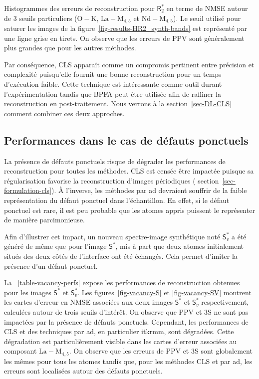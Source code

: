 \begin{normalfigure*}
    \caption{Histogrammes des erreurs de reconstruction pour $\mathsf{R}_2^*$ en terme de NMSE autour de 3 seuils particuliers ($\mathrm{O-K}$, $\mathrm{La-M}_{4, 5}$ et $\mathrm{Nd-M}_{4, 5}$). Le seuil utilisé pour saturer les images de la figure~\protect\ref{fig-results-HR2_synth-bands} est représenté par une ligne grise en tirets. On observe que les erreurs de PPV sont généralement plus grandes que pour les autres méthodes.
        \protect\label{fig-qu1-21-histograms}}    
\end{normalfigure*}


Par conséquence, CLS apparaît comme un compromis pertinent entre précision et complexité puisqu'elle fournit une bonne reconstruction pour un temps d'exécution faible. Cette technique est intéressante comme outil durant l'expérimentation tandis que BPFA peut être utilisée afin de raffiner la reconstruction en post-traitement. Nous verrons à la section~\ref{sec-DL-CLS} comment combiner ces deux approches.



\subsection{Performances dans le cas de défauts ponctuels}

La présence de défauts ponctuels risque de dégrader les performances de reconstruction pour toutes les méthodes. CLS est censée être impactée puisque sa régularisation favorise la reconstruction d'images périodiques (\cf{} section~\ref{sec-formulation-cls}). \`A l'inverse, les méthodes par \gls{ad} devraient souffrir de la faible  représentation du défaut ponctuel dans l'échantillon. En effet, si le défaut ponctuel est rare, il est peu probable que les atomes appris puissent le représenter de manière parcimonieuse.

Afin d'illustrer cet impact, un nouveau spectre-image synthétique noté $\mathsf{S}_v^*$ a été généré de même que pour l'image $\mathsf{S}^*$, mis à part que deux atomes initialement situés des deux côtés de l'interface ont été échangés. Cela permet d'imiter la présence d'un défaut ponctuel.

La \tabname~\ref{table-vacancy-perfs} expose les performances de reconstruction obtenues pour les images $\mathsf{S}^*$ et $\mathsf{S}_v^*$. Les figures~\ref{fig-vacancy-S} et \ref{fig-vacancy-SV} montrent les cartes d'erreur en NMSE associées aux deux images $\mathsf{S}^*$ et $\mathsf{S}_v^*$ respectivement, calculées autour de trois seuils d'intérêt. On observe que PPV et 3S ne sont pas impactées par la présence de défauts ponctuels. Cependant, les performances de CLS et des techniques par \gls{ad}, en particulier \gls{itkrmm}, sont dégradées. Cette dégradation est particulièrement visible dans les cartes d'erreur associées au composant $\mathrm{La-M}_{4, 5}$. On observe que les erreurs de PPV et 3S sont globalement les mêmes  pour tous les atomes tandis que, pour les méthodes CLS et par \gls{ad}, les erreurs sont localisées autour des défauts ponctuels.

